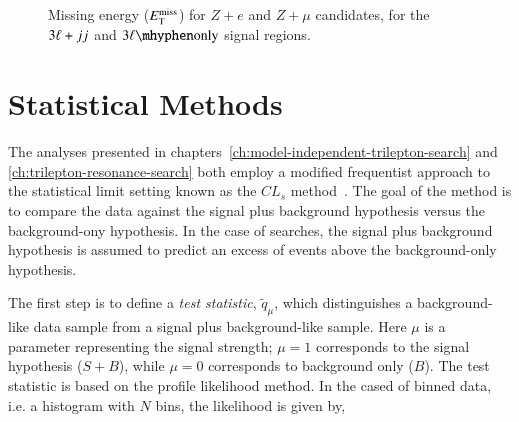 \begin{appendices}
\begin{figure}[htb]
{  }
  \caption{Missing energy ($E_{\text{T}}^{\text{miss}}$) for $Z+e$ and $Z+\mu$ candidates, for the $3\ell+jj$ and $\threelo$ signal regions.}
  \label{fig:SR-ETMiss-2}
\end{figure}

\clearpage

\chapter{Statistical Methods}\label{appx:statistics}
The analyses presented in chapters~\ref{ch:model-independent-trilepton-search} and \ref{ch:trilepton-resonance-search} both employ a modified frequentist approach to the statistical limit setting known as the $CL_s$ method~\cite{cls}. The goal of the method is to compare the data against the signal plus background hypothesis versus the background-ony hypothesis. In the case of searches, the signal plus background hypothesis is assumed to predict an excess of events above the background-only hypothesis. 

The first step is to define a \emph{test statistic}, $\tilde{q}_{\mu}$, which distinguishes a background-like data sample from a signal plus background-like sample. Here $\mu$ is a parameter representing the signal strength; $\mu=1$ corresponds to the signal hypothesis ($S+B$), while $\mu=0$ corresponds to background only ($B$). The test statistic is based on the profile likelihood method. In the cased of binned data, i.e. a histogram with $N$ bins, the likelihood is given by,


\end{appendices}
